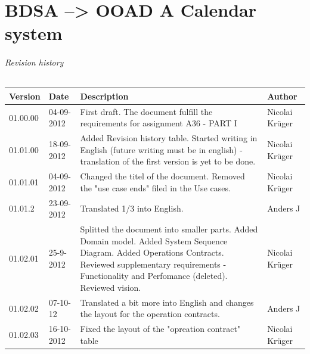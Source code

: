 \documentclass{article}
\begin{document}
  
  \part*{BDSA --> OOAD \linebreak A Calendar system}
  
  \paragraph{Revision history} \mbox{}  
  
  \begin{table}[ht]
    \begin{tabular}{|p{35pt}|p{50pt}|p{150pt}|p{75pt}|}
        \hline
        Version & Date &
        Description & 
        Author         
        \\ \hline
        01.00.00 & 04-09-2012 & 
        First draft. The document fulfill the requirements for assignment A36 - PART I &
        Nicolai Krüger 
        \\ \hline        
        01.01.00 & 18-09-2012 & 
        Added Revision history table. Started writing in English (future writing must be in english) - translation of the first version is yet to be done. & 
        Nicolai Krüger              
        \\ \hline
        01.01.01 & 04-09-2012 &
        Changed the titel of the document. \linebreak
        Removed the "use case ends" filed in the Use cases. &
        Nicolai Krüger
        \\ \hline
        01.01.2 & 23-09-2012 & 
        Translated 1/3 into English. &
        Anders J
        \\ \hline
        01.02.01 & 25-9-2012 &
        Splitted the document into smaller parts.
        Added Domain model.
        Added System Sequence Diagram.
        Added Operations Contracts.
        Reviewed supplementary requirements - Functionality and Perfomance (deleted).
        Reviewed vision. &
        Nicolai Krüger
        \\ \hline
        01.02.02 & 07-10-12 & 
        Translated a bit more into English and changes the layout for the operation contracts. &
        Anders J
        \\ \hline
        01.02.03 & 16-10-2012 &
        Fixed the layout of the "opreation contract" table &
        Nicolai Krüger
        \\ \hline
    \end{tabular}
\end{table}
  
\end{document}
